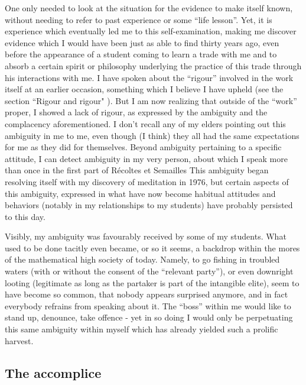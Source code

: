 One only needed to look at the situation for the evidence to make itself known, without
needing to refer to past experience or some ``life lesson''.
Yet, it is experience which eventually led me to this self-examination,
making me discover evidence which I would have been just as able to find thirty
years ago, even before the appearance of a student coming to learn a trade with me 
and to absorb a certain spirit or philosophy underlying the practice of this trade through
his interactions with me. I have spoken about the ``rigour'' involved in the work itself at
an earlier occasion, something which I believe I have upheld (see the section ``Rigour and
rigour" ). But I am now realizing that outside of the ``work'' proper, I showed a
lack of rigour, as expressed by the ambiguity and the complacency aforementioned. 
I don't recall any of my elders pointing out this ambiguity in me to me, even though (I
think) they all had the same expectations for me as they did for themselves. Beyond
ambiguity pertaining to a specific attitude, I can detect ambiguity in my very person,
about which I speak more than once in the first part of R\'ecoltes et Semailles
This ambiguity began resolving itself with my discovery of meditation in 1976, but certain
aspects of this ambiguity, expressed in what have now become habitual attitudes and
behaviors (notably in my relationships to my students) have probably persisted to this
day. 

Visibly, my ambiguity was favourably received by some of my students. 
What used to be done tacitly even became, or so it seems, a backdrop within the mores of
the mathematical high society of today.
Namely, to go fishing in troubled waters (with or without the consent of the ``relevant
party''), or even downright looting (legitimate as long as the partaker is part of the
intangible elite), seem to have become so common, that nobody appears surprised anymore,
and in fact everybody refrains from speaking about it. The ``boss'' within me would like
to stand up, denounce, take offence - yet in so doing I would only be perpetuating this
same ambiguity within myself which has already yielded such a prolific harvest.

\subsection{The accomplice}

